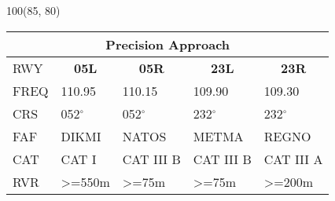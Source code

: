 \documentclass[10pt,landscape,a4paper]{article}
\begin{document}
\begin{textblock}{100}(85, 80)
\begin{table}[]
\begin{tabular}{lllll}
\multicolumn{5}{c}{\textbf{Precision Approach}} \\ \hline
\multicolumn{1}{|l|}{RWY} & \multicolumn{1}{c|}{\textbf{05L}} & \multicolumn{1}{c|}{\textbf{05R}} & \multicolumn{1}{c|}{\textbf{23L}} & \multicolumn{1}{c|}{\textbf{23R}} \\ \hline
\multicolumn{1}{|l|}{FREQ} & \multicolumn{1}{l|}{110.95} & \multicolumn{1}{l|}{110.15} & \multicolumn{1}{l|}{109.90} & \multicolumn{1}{l|}{109.30} \\
\multicolumn{1}{|l|}{CRS} & \multicolumn{1}{l|}{052$^\circ$} & \multicolumn{1}{l|}{052$^\circ$} & \multicolumn{1}{l|}{232$^\circ$} & \multicolumn{1}{l|}{232$^\circ$} \\
\multicolumn{1}{|l|}{FAF} & \multicolumn{1}{l|}{DIKMI} & \multicolumn{1}{l|}{NATOS} & \multicolumn{1}{l|}{METMA} & \multicolumn{1}{l|}{REGNO} \\
\multicolumn{1}{|l|}{CAT} & \multicolumn{1}{l|}{CAT I} & \multicolumn{1}{l|}{CAT III B} & \multicolumn{1}{l|}{CAT III B} & \multicolumn{1}{l|}{CAT III A} \\
\multicolumn{1}{|l|}{RVR} & \multicolumn{1}{l|}{\textgreater{}=550m} & \multicolumn{1}{l|}{\textgreater{}=75m} & \multicolumn{1}{l|}{\textgreater{}=75m} & \multicolumn{1}{l|}{\textgreater{}=200m} \\ \hline
\end{tabular}
\end{table}
\end{textblock}
\end{document}
